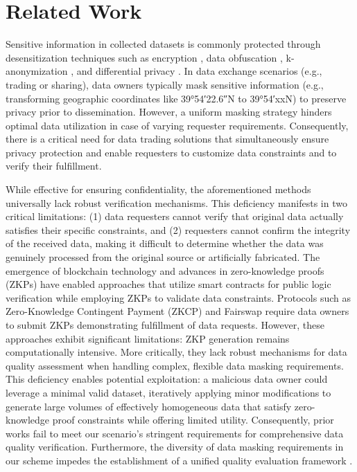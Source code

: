 \documentclass[journal]{IEEEtran}
\begin{document}
  
\section{Related Work} \label{section:related_work}
Sensitive information in collected datasets is commonly protected through desensitization techniques such as encryption \cite{yamac2020multi,eshun2024cryptographic}, data obfuscation \cite{hong2023location,li2023privacy}, k-anonymization \cite{hoang2023protecting}, and differential privacy \cite{hu2023federated}.   In data exchange scenarios (e.g., trading or sharing), data owners typically mask sensitive information (e.g., transforming geographic coordinates like \ang{39;54;22.6}N to \ang{39;54;}xxN) to preserve privacy prior to dissemination. However, a uniform masking strategy hinders optimal data utilization in case of varying requester requirements. Consequently, there is a critical need for data trading solutions that simultaneously ensure privacy protection and enable requesters to customize data constraints and to verify their fulfillment.

While effective for ensuring confidentiality, the aforementioned methods universally lack robust verification mechanisms. This deficiency manifests in two critical limitations: (1) data requesters cannot verify that original data actually satisfies their specific constraints, and (2) requesters cannot confirm the integrity of the received data, making it difficult to determine whether the data was genuinely processed from the original source or artificially fabricated. The emergence of blockchain technology \cite{buterin2013ethereum} and advances in zero-knowledge proofs (ZKPs) \cite{ben2014succinct,groth2016size,gabizon2019Plonk} have enabled approaches that utilize smart contracts for public logic verification while employing ZKPs to validate data constraints. Protocols such as Zero-Knowledge Contingent Payment (ZKCP) \cite{campanelli2017zero} and Fairswap \cite{dziembowski2018fairswap} require data owners to submit ZKPs demonstrating fulfillment of data requests. However, these approaches exhibit significant limitations: ZKP generation remains computationally intensive. More critically, they lack robust mechanisms for data quality assessment when handling complex, flexible data masking requirements.  This deficiency enables potential exploitation: a malicious data owner could leverage a minimal valid dataset, iteratively applying minor modifications to generate large volumes of effectively homogeneous data that satisfy zero-knowledge proof constraints while offering limited utility.  Consequently, prior works fail to meet our scenario's stringent requirements for comprehensive data quality verification. Furthermore, the diversity of data masking requirements in our scheme impedes the establishment of a unified quality evaluation framework \cite{zhao2019data,zhao2020pace}. 
\end{document}
